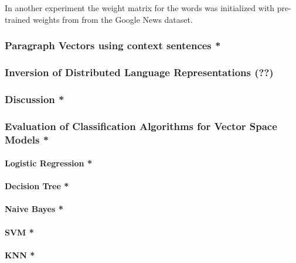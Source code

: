 In another experiment the weight matrix for the words was initialized with pre-trained weights from from the Google News dataset.

\subsubsection{Paragraph Vectors using context sentences *}


\subsubsection{Inversion of Distributed Language Representations (??)}


\subsubsection{Discussion *}


\subsubsection{Evaluation of Classification Algorithms for Vector Space Models *}

\paragraph{Logistic Regression *}

\paragraph{Decision Tree *}

\paragraph{Naive Bayes *}

\paragraph{SVM *}
\paragraph{KNN *}
